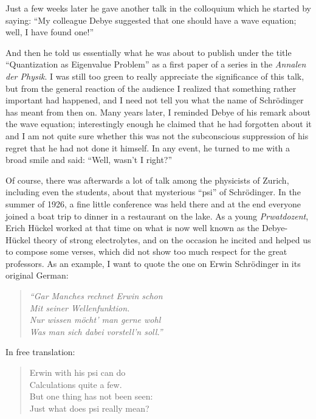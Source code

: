 \documentclass[12pt]{article}
\begin{document}
Just a few weeks later he gave another
talk in the colloquium which he started by saying: ``My colleague Debye suggested that one should have a wave equation; well, I have found one!''

And then he told us essentially what he was about to publish under the title ``Quantization as Eigenvalue Problem'' as a first paper of a series in the {\it Annalen der Physik}. I was still too green to really appreciate the significance of this talk, but from the general reaction of the audience I realized that something rather important had happened, and I need not tell you what the name of Schr\"odinger has meant from then on. Many years later, I reminded Debye of his remark about the wave equation; interestingly enough he claimed that he had forgotten about it and I am not quite sure whether this was not the subconscious suppression of his regret that he had not done it himself. In any event, he turned to me with a broad smile and said: ``Well, wasn't I right?''

Of course, there was afterwards a lot of talk among the physicists of Zurich, including even the students, about that mysterious ``psi'' of Schr\"odinger. In the summer of 1926, a fine little conference was held there and at the end everyone
joined a boat trip to dinner in a restaurant on the lake. As a young {\it Prwatdozent}, Erich H\"uckel worked at that time on what is now well known as the Debye-H\"uckel theory of strong electrolytes, and on the occasion he incited and helped us to compose some verses, which did not show too much respect for the great professors. As an example, I want to quote the one on Erwin Schr\"odinger in its original German:

\begin{quote}
\it
``Gar Manches rechnet Erwin schon\\
Mit seiner Wellenfunktion.\\
Nur wissen m\"ocht' man gerne wohl\\
Was man sich dabei vorstell'n soll.''
\end{quote}

\noindent
In free translation:

\begin{quote}
Erwin with his psi can do\\
Calculations quite a few.\\
But one thing has not been seen:\\
Just what does psi really mean?
\end{quote}
\end{document}
